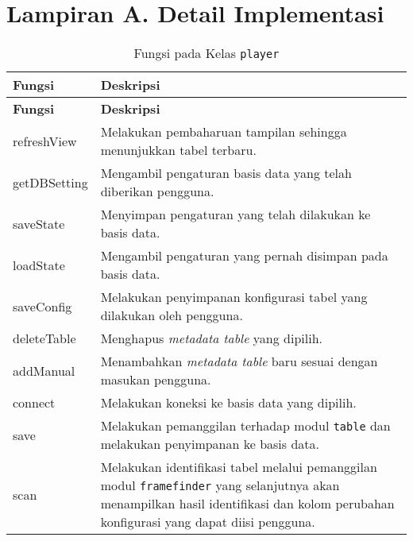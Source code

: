 \chapter{Lampiran A. Detail Implementasi}

\begin{small}
\begin{longtable}{ | p{2cm} | p{10cm} | }
    \caption{Fungsi pada Kelas \texttt{player}}
    \label{FungsiModulPlayer}\\ \hline
    \centering\bfseries{Fungsi} & \centering\bfseries{Deskripsi} \tabularnewline \hline
    \endfirsthead
    \hline
    \centering\bfseries{Fungsi} & \centering\bfseries{Deskripsi} \tabularnewline \hline
    \endhead
    refreshView & Melakukan pembaharuan tampilan sehingga menunjukkan tabel terbaru.\\ \hline
    getDBSetting & Mengambil pengaturan basis data yang telah diberikan pengguna.\\ \hline
    saveState & Menyimpan pengaturan yang telah dilakukan ke basis data.\\ \hline
    loadState & Mengambil pengaturan yang pernah disimpan pada basis data.\\ \hline
    saveConfig & Melakukan penyimpanan konfigurasi tabel yang dilakukan oleh pengguna. \\ \hline
    deleteTable & Menghapus \textit{metadata table} yang dipilih.\\ \hline
    addManual & Menambahkan \textit{metadata table} baru sesuai dengan masukan pengguna.\\ \hline
    connect & Melakukan koneksi ke basis data yang dipilih. \\ \hline
    save & Melakukan pemanggilan terhadap modul \texttt{table} dan melakukan penyimpanan ke basis data. \\ \hline
    scan & Melakukan identifikasi tabel melalui pemanggilan modul \texttt{framefinder} yang selanjutnya akan menampilkan hasil identifikasi dan kolom perubahan konfigurasi yang dapat diisi pengguna. \\ \hline
\end{longtable}
\end{small}


